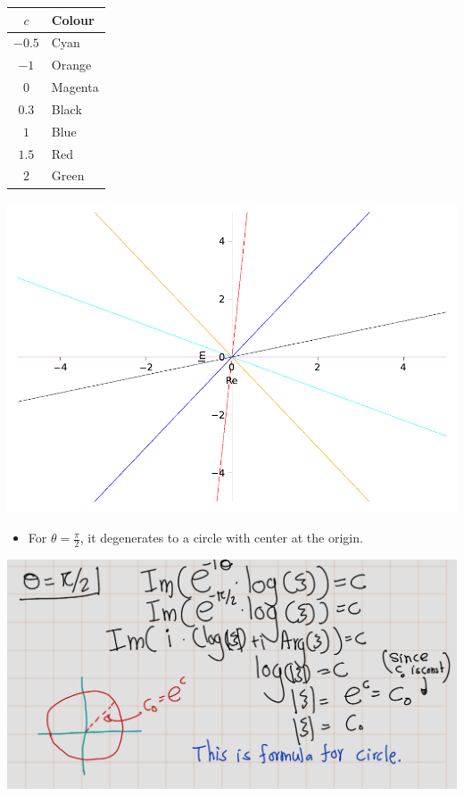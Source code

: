 \documentclass[
]{book}
\providecommand{\tightlist}{%
  \setlength{\itemsep}{0pt}\setlength{\parskip}{0pt}}
\theoremstyle{definition}
\theoremstyle{definition}
\theoremstyle{definition}
\theoremstyle{definition}
\theoremstyle{remark}
\begin{document}
\begin{longtable}[]{@{}cl@{}}
\toprule\noalign{}
\(c\) & Colour \\
\midrule\noalign{}
\endhead
\bottomrule\noalign{}
\endlastfoot
\(-0.5\) & Cyan \\
\(-1\) & Orange \\
\(0\) & Magenta \\
\(0.3\) & Black \\
\(1\) & Blue \\
\(1.5\) & Red \\
\(2\) & Green \\
\end{longtable}

\includegraphics{ConformalMapping_files/figure-latex/unnamed-chunk-67-1.pdf}

\begin{itemize}
\tightlist
\item
  For \(\theta = \frac{\pi}{2}\), it degenerates to a circle with center at the origin.
\end{itemize}

\includegraphics[width=20.99in]{figures/Helical_Domain/fig3}
\end{document}
